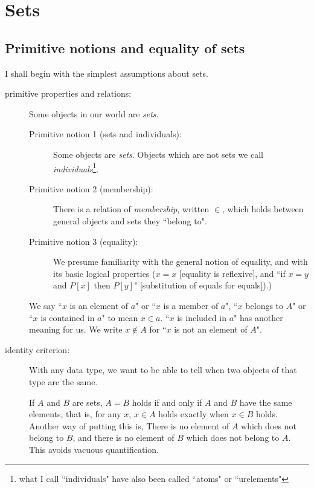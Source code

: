 \documentclass[12pt]{article}
\begin{document}
\section{Sets}

\subsection{Primitive notions and equality of sets}

I shall begin with the simplest assumptions about sets.

\begin{description}

\item[primitive properties and relations:]  Some objects in our world are {\em sets\/}.  

\begin{description}

\item[Primitive notion 1 (sets and individuals):]  Some objects are {\em sets\/}.  Objects which are not sets we call {\em individuals\/}\footnote{what I call ``individuals" have also been called ``atoms" or ``urelements"}.

\item[Primitive notion 2 (membership):]  There is a relation of {\em membership}, written $\in$, which holds between general objects and sets they ``belong to".

\item[Primitive notion 3 (equality):]  We presume familiarity with the general notion of equality, and with its basic logical properties ($x=x$ [equality is reflexive], and ``if $x=y$ and $P[x]$ then $P[y]$" [substitution of equals for equals]).)

\end{description} 

We say ``$x$ is an element of $a$" or ``$x$ is a member of $a$", ``$x$ belongs to $A$" or ``$x$ is contained in $a$" to mean $x \in a$.   ``$x$ is included in $a$" has another meaning for us.  We write $x \not\in A$ for ``$x$ is not an element of $A$".

\item[identity criterion:]  With any data type, we want to be able to tell when two objects of that type are the same.

If $A$ and $B$ are sets, $A=B$ holds if and only if $A$ and $B$ have the same elements, that is, for any $x$, $x \in A$ holds exactly when $x \in B$ holds.   Another way of putting this is, There is no element of $A$ which does not belong to $B$, and there is no element of $B$ which does not belong to $A$.  This avoids vacuous quantification.


\end{description}
\end{document}

